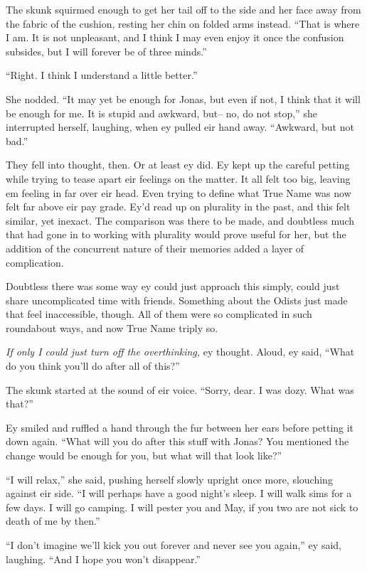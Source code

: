 The skunk squirmed enough to get her tail off to the side and her face away from the fabric of the cushion, resting her chin on folded arms instead. ``That is where I am. It is not unpleasant, and I think I may even enjoy it once the confusion subsides, but I will forever be of three minds.''

``Right. I think I understand a little better.''

She nodded. ``It may yet be enough for Jonas, but even if not, I think that it will be enough for me. It is stupid and awkward, but-- no, do not stop,'' she interrupted herself, laughing, when ey pulled eir hand away. ``Awkward, but not bad.''

They fell into thought, then. Or at least ey did. Ey kept up the careful petting while trying to tease apart eir feelings on the matter. It all felt too big, leaving em feeling in far over eir head. Even trying to define what True Name was now felt far above eir pay grade. Ey'd read up on plurality in the past, and this felt similar, yet inexact. The comparison was there to be made, and doubtless much that had gone in to working with plurality would prove useful for her, but the addition of the concurrent nature of their memories added a layer of complication.

Doubtless there was some way ey could just approach this simply, could just share uncomplicated time with friends. Something about the Odists just made that feel inaccessible, though. All of them were so complicated in such roundabout ways, and now True Name triply so.

\emph{If only I could just turn off the overthinking,} ey thought. Aloud, ey said, ``What do you think you'll do after all of this?''

The skunk started at the sound of eir voice. ``Sorry, dear. I was dozy. What was that?''

Ey smiled and ruffled a hand through the fur between her ears before petting it down again. ``What will you do after this stuff with Jonas? You mentioned the change would be enough for you, but what will that look like?''

``I will relax,'' she said, pushing herself slowly upright once more, slouching against eir side. ``I will perhaps have a good night's sleep. I will walk sims for a few days. I will go camping. I will pester you and May, if you two are not sick to death of me by then.''

``I don't imagine we'll kick you out forever and never see you again,'' ey said, laughing. ``And I hope you won't disappear.''

